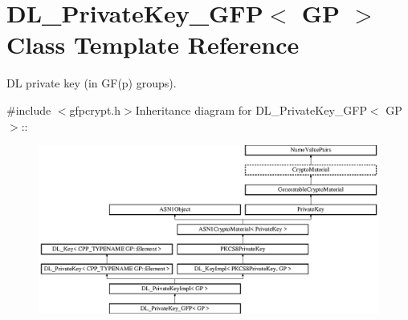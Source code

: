 \hypertarget{class_d_l___private_key___g_f_p}{
\section{DL\_\-PrivateKey\_\-GFP$<$ GP $>$ Class Template Reference}
\label{class_d_l___private_key___g_f_p}
}


DL private key (in GF(p) groups).  


{\ttfamily \#include $<$gfpcrypt.h$>$}Inheritance diagram for DL\_\-PrivateKey\_\-GFP$<$ GP $>$::\begin{figure}[H]
\begin{center}
\leavevmode
\includegraphics[height=5.56291cm]{class_d_l___private_key___g_f_p}
\end{center}
\end{figure}
